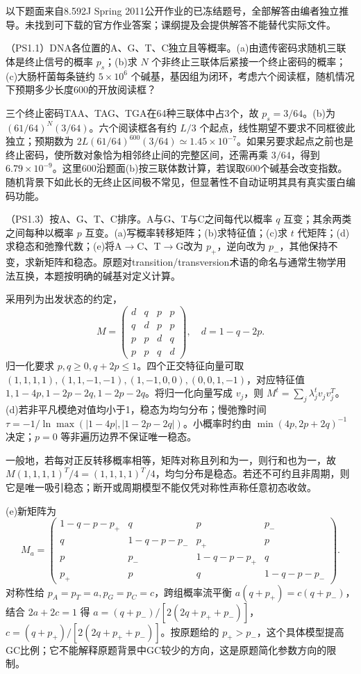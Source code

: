 以下题面来自8.592J Spring 2011公开作业的已冻结题号，全部解答由编者独立推导。未找到可下载的官方作业答案；课纲提及会提供解答不能替代实际文件。
\begin{exercise}\label{ex:orf}
（PS1.1）DNA各位置的A、G、T、C独立且等概率。(a)由遗传密码求随机三联体是终止信号的概率 $p_s$；(b)求 $N$ 个非终止三联体后紧接一个终止密码的概率；(c)大肠杆菌每条链约 $5\times10^6$ 个碱基，基因组为闭环，考虑六个阅读框，随机情况下预期多少长度600的开放阅读框？
\end{exercise}
\begin{solution}
三个终止密码TAA、TAG、TGA在64种三联体中占3个，故 $p_s=3/64$。(b)为 $(61/64)^N(3/64)$。六个阅读框各有约 $L/3$ 个起点，线性期望不要求不同框彼此独立；预期数为 $2L(61/64)^{600}(3/64)\simeq1.45\times10^{-7}$。如果另要求起点之前也是终止密码，使所数对象恰为相邻终止间的完整区间，还需再乘 $3/64$，得到 $6.79\times10^{-9}$。这里600沿题面(b)按三联体数计算，若误取600个碱基会改变指数。随机背景下如此长的无终止区间极不常见，但显著性不自动证明其具有真实蛋白编码功能。
\end{solution}

\begin{exercise}
（PS1.3）按A、G、T、C排序。A与G、T与C之间每代以概率 $q$ 互变；其余两类之间每种以概率 $p$ 互变。(a)写概率转移矩阵；(b)求特征值；(c)求 $t$ 代矩阵；(d)求稳态和弛豫代数；(e)将A$\to$C、T$\to$G改为 $p_+$，逆向改为 $p_-$，其他保持不变，求新矩阵和稳态。原题对transition/transversion术语的命名与通常生物学用法互换，本题按明确的碱基对定义计算。
\end{exercise}
\begin{solution}
采用列为出发状态的约定，
\[
M=\begin{pmatrix}d&q&p&p\\q&d&p&p\\p&p&d&q\\p&p&q&d\end{pmatrix},\quad d=1-q-2p.
\]
归一化要求 $p,q\ge0,q+2p\le1$。四个正交特征向量可取 $(1,1,1,1),(1,1,-1,-1),(1,-1,0,0),(0,0,1,-1)$，对应特征值 $1,1-4p,1-2p-2q,1-2p-2q$。将归一化向量写成 $v_j$，则 $M^t=\sum_j\lambda_j^tv_jv_j^T$。(d)若非平凡模绝对值均小于1，稳态为均匀分布；慢弛豫时间 $\tau=-1/\ln\max(|1-4p|,|1-2p-2q|)$。小概率时约由 $\min(4p,2p+2q)^{-1}$ 决定；$p=0$ 等非遍历边界不保证唯一稳态。

一般地，若每对正反转移概率相等，矩阵对称且列和为一，则行和也为一，故 $M(1,1,1,1)^T/4=(1,1,1,1)^T/4$，均匀分布是稳态。若还不可约且非周期，则它是唯一吸引稳态；断开或周期模型不能仅凭对称性声称任意初态收敛。

(e)新矩阵为
\[
M_a=\begin{pmatrix}1-q-p-p_+&q&p&p_-\\q&1-q-p-p_-&p_+&p\\p&p_-&1-q-p-p_+&q\\p_+&p&q&1-q-p-p_-\end{pmatrix}.
\]
对称性给 $p_A=p_T=a,p_G=p_C=c$，跨组概率流平衡 $a(q+p_+)=c(q+p_-)$，结合 $2a+2c=1$ 得 $a=(q+p_-)/[2(2q+p_++p_-)]$，$c=(q+p_+)/[2(2q+p_++p_-)]$。按原题给的 $p_+>p_-$，这个具体模型提高GC比例；它不能解释原题背景中GC较少的方向，这是原题简化参数方向的限制。
\end{solution}


